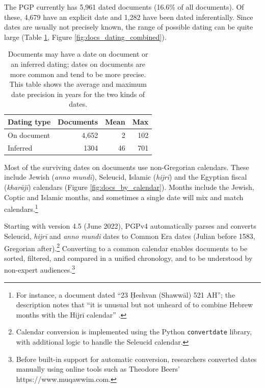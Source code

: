 \documentclass{article}
\def\totalDatedDocs{5,961}
\def\percentDatedDocs{16.6\%}
\def\totalDateOnDoc{4,679}
\def\totalInferredDate{1,282}
\begin{document}
The PGP currently has \totalDatedDocs\hspace{0.25ex} dated documents (\percentDatedDocs\hspace{0.25ex} of all documents). Of these, \totalDateOnDoc\hspace{0.25ex} have an explicit date and \totalInferredDate\hspace{0.25ex} have been dated inferentially. Since dates are usually not precisely known, the range of possible dating can be quite large (Table \ref{table:date-precision}, Figure \ref{fig:docs_dating_combined}).

\begin{table}
\begin{center}
\caption{Documents may have a date on document or an inferred dating; dates on documents are more common and tend to be more precise. This table shows the average and maximum date precision in years for the two kinds of dates.}
\label{table:date-precision}
\begin{tabular}{lrrr}
\toprule
Dating type & Documents & Mean & Max \\
\midrule
On document & 4,652 & 2 & 102\\
Inferred & 1304 & 46 & 701 \\
\bottomrule
\end{tabular}
\end{center}
\end{table}

Most of the surviving dates on documents use non-Gregorian calendars. These include Jewish (\textit{anno mundi}),  Seleucid, Islamic (\textit{hijrī}) and the Egyptian fiscal (\textit{kharājī}) calendars (Figure \ref{fig:docs_by_calendar}). Months include the Jewish, Coptic and Islamic months, and sometimes a single date will mix and match calendars.\footnote{For instance, a document dated “23 Ḥeshvan (Shawwāl) 521 AH”;  the description notes that “it is unusual but not unheard of to combine Hebrew months with the Hijrī calendar” \autocite{noauthor_legal_1127} .} 

Starting with version 4.5 (June 2022), PGPv4 automatically parses and converts Seleucid, \textit{hijrī} and \textit{anno mundi} dates to Common Era dates (Julian before 1583, Gregorian after).\footnote{Calendar conversion is implemented using the Python \texttt{convertdate} library, with additional logic to handle the Seleucid calendar.} Converting to a common calendar enables documents to be sorted, filtered, and compared in a unified chronology, and to be understood by non-expert audiences.\footnote{Before built-in support for automatic conversion, researchers converted dates manually using online tools such as Theodore Beers' https://www.muqawwim.com.} 
\end{document}
